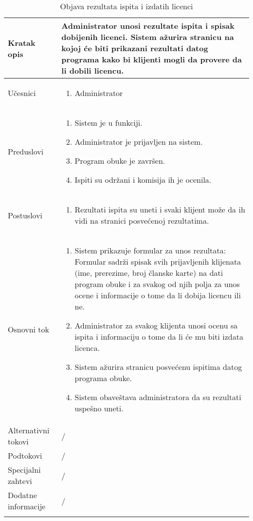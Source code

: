 \documentclass[../../main.tex]{subfiles}
\begin{document}
\begin{longtable}{| p{} | p{} |} 
\hline
    Kratak opis & Administrator unosi rezultate ispita i spisak dobijenih licenci. Sistem ažurira stranicu na kojoj će biti prikazani rezultati datog programa kako bi klijenti mogli da provere da li dobili licencu. \\ 
\hline    
    Učesnici &
    \begin{enumerate}
        \item Administrator
    \end{enumerate}\\
\hline
   Preduslovi &
   \begin{enumerate}
        \item Sistem je u funkciji.
        \item Administrator je prijavljen na sistem.
        \item Program obuke je završen.
        \item Ispiti su održani i komisija ih je ocenila.
    \end{enumerate}\\
\hline  
    Postuslovi & 
    \begin{enumerate}
        \item Rezultati ispita su uneti i svaki klijent može da ih vidi na stranici posvećenoj rezultatima.
    \end{enumerate} \\
\hline
    Osnovni tok & 
    \begin{enumerate}
        \item Sistem prikazuje formular za unos rezultata:
        Formular sadrži spisak svih prijavljenih klijenata (ime, prerezime, broj članske karte) na dati program obuke i za svakog od njih polja za unos ocene i informacije o tome da li dobija licencu ili ne.
        \item Administrator za svakog klijenta unosi ocenu sa ispita i informaciju o tome da li će mu biti izdata licenca.
        \item Sistem ažurira stranicu posvećenu ispitima datog programa obuke.
        \item Sistem obaveštava administratora da su rezultati uspešno uneti.
    \end{enumerate}\\
\hline
    Alternativni tokovi & / \\
\hline
    Podtokovi & /\\
\hline
    Specijalni zahtevi & /\\
\hline
    Dodatne informacije & /\\
\hline
\caption{Objava rezultata ispita i izdatih licenci}
\end{longtable}
\end{document}

